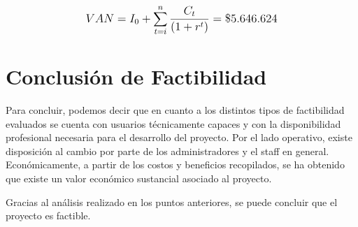 \[
\mathlarger{
	{VAN} = I_0 + \sum\limits_{t=i}^{n}\frac{C_t}{\left(1+r^t\right)} = \$5.646.624
}
\]

\section{Conclusión de Factibilidad}
Para concluir, podemos decir que en cuanto a los distintos tipos de factibilidad evaluados se cuenta con usuarios técnicamente capaces y con la disponibilidad profesional necesaria para el desarrollo del proyecto. Por el lado operativo, existe disposición al cambio por parte de los administradores y el staff en general. Económicamente, a partir de los costos y beneficios recopilados, se ha obtenido que existe un valor económico sustancial asociado al proyecto.

Gracias al análisis realizado en los puntos anteriores, se puede concluir que el proyecto es factible.
